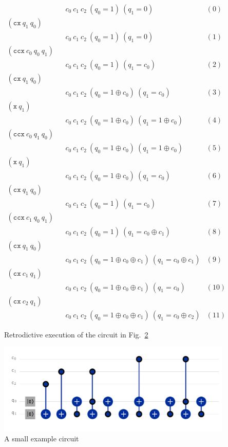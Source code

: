 \documentclass{article}
\begin{document}
\begin{figure}[t]
\[\begin{array}{lclr}
&& c_0~c_1~c_2~(q_0=1)~(q_1=0) & (0) \\
(\texttt{cx}~q_1~q_0)      \\ && c_0~c_1~c_2~(q_0=1)~(q_1=0) & (1) \\
(\texttt{ccx}~c_0~q_0~q_1) \\ && c_0~c_1~c_2~(q_0=1)~(q_1=c_0) & (2) \\
(\texttt{cx}~q_1~q_0)      \\ && c_0~c_1~c_2~(q_0=1 \oplus c_0)~(q_1=c_0) & (3) \\
(\texttt{x}~q_1)           \\ && c_0~c_1~c_2~(q_0=1 \oplus c_0)~(q_1=1 \oplus c_0) & (4) \\
(\texttt{ccx}~c_0~q_1~q_0) \\ && c_0~c_1~c_2~(q_0=1 \oplus c_0)~(q_1=1 \oplus c_0) & (5) \\
(\texttt{x}~q_1)           \\ && c_0~c_1~c_2~(q_0=1 \oplus c_0)~(q_1=c_0) & (6) \\
(\texttt{cx}~q_1~q_0)      \\ && c_0~c_1~c_2~(q_0=1)~(q_1=c_0) & (7) \\
(\texttt{ccx}~c_1~q_0~q_1) \\ && c_0~c_1~c_2~(q_0=1)~(q_1=c_0 \oplus c_1) & (8) \\
(\texttt{cx}~q_1~q_0)      \\ && c_0~c_1~c_2~(q_0=1 \oplus c_0 \oplus c_1)~(q_1=c_0 \oplus c_1) & (9) \\
(\texttt{cx}~c_1~q_1)      \\ && c_0~c_1~c_2~(q_0=1 \oplus c_0 \oplus c_1)~(q_1=c_0) & (10) \\
(\texttt{cx}~c_2~q_1)      \\ && c_0~c_1~c_2~(q_0=1 \oplus c_0 \oplus c_1)~(q_1=c_0 \oplus c_2) & (11)
\end{array}\]
\caption{Retrodictive execution of the circuit in Fig.~\ref{fig:factor}}
\label{fig:deriv}
\end{figure}

\begin{figure}[t]
    \centering
    \includegraphics[scale=0.7]{factor.pdf}
    \caption{A small example circuit}
    \label{fig:factor}
\end{figure}
\end{document}
